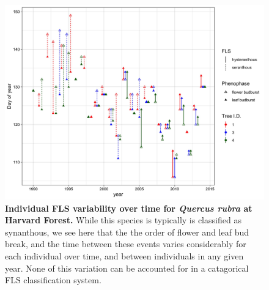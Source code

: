 \documentclass[12pt]{article}
\begin{document}
 \begin{figure}[ht]
        \centering
          \includegraphics[width=\textwidth]{..//figure/HF_Q_ru_interannual.jpeg}
        \caption{\textbf{Individual FLS variability over time for \textit{Quercus rubra} at Harvard Forest.} While this species is typically is classified as synanthous, we see here that the the order of flower and leaf bud break, and the time between these events varies considerably for each individual over time, and between individuals in any given year. None of this variation can be accounted for in a catagorical FLS classification system.}
        \label{fig: Figure 3}
    \end{figure}
  
\end{document}
